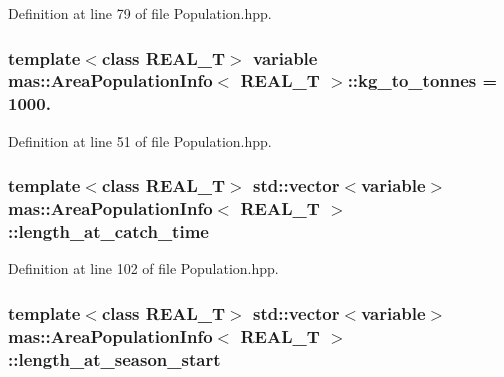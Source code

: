 Definition at line 79 of file Population.\-hpp.

\hypertarget{structmas_1_1_area_population_info_a57d3f8bab19c26fb9e981afcdb80fb4f}{
\subsubsection[{kg\-\_\-to\-\_\-tonnes}]{\setlength{\rightskip}{0pt plus 5cm}template$<$class R\-E\-A\-L\-\_\-\-T$>$ {\bf variable} {\bf mas\-::\-Area\-Population\-Info}$<$ R\-E\-A\-L\-\_\-\-T $>$\-::kg\-\_\-to\-\_\-tonnes = 1000.}}\label{structmas_1_1_area_population_info_a57d3f8bab19c26fb9e981afcdb80fb4f}


Definition at line 51 of file Population.\-hpp.

\hypertarget{structmas_1_1_area_population_info_abde813f753a9b255e06476c5d9db5240}{
\subsubsection[{length\-\_\-at\-\_\-catch\-\_\-time}]{\setlength{\rightskip}{0pt plus 5cm}template$<$class R\-E\-A\-L\-\_\-\-T$>$ std\-::vector$<${\bf variable}$>$ {\bf mas\-::\-Area\-Population\-Info}$<$ R\-E\-A\-L\-\_\-\-T $>$\-::length\-\_\-at\-\_\-catch\-\_\-time}}\label{structmas_1_1_area_population_info_abde813f753a9b255e06476c5d9db5240}


Definition at line 102 of file Population.\-hpp.

\hypertarget{structmas_1_1_area_population_info_a481004bc1cd53ff327d50aa8058ca34b}{
\subsubsection[{length\-\_\-at\-\_\-season\-\_\-start}]{\setlength{\rightskip}{0pt plus 5cm}template$<$class R\-E\-A\-L\-\_\-\-T$>$ std\-::vector$<${\bf variable}$>$ {\bf mas\-::\-Area\-Population\-Info}$<$ R\-E\-A\-L\-\_\-\-T $>$\-::length\-\_\-at\-\_\-season\-\_\-start}}\label{structmas_1_1_area_population_info_a481004bc1cd53ff327d50aa8058ca34b}


